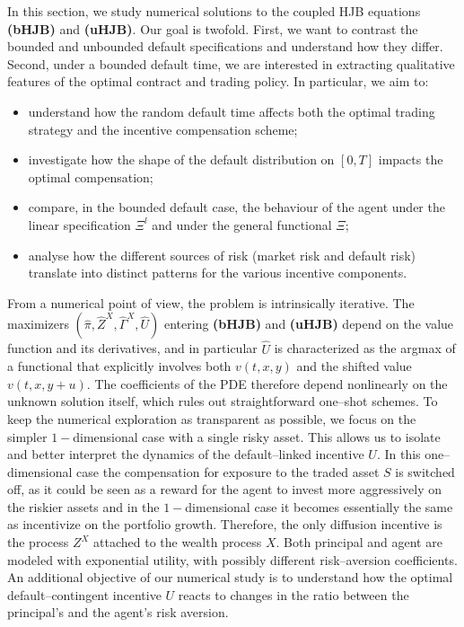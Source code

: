 \documentclass[11pt,a4paper]{article}
\theoremstyle{thmstyleone}%
\theoremstyle{thmstyletwo}%
\theoremstyle{thmstylethree}%
\begin{document}
In this section, we study numerical solutions to the coupled HJB equations
\textbf{(bHJB)} and \textbf{(uHJB)}. Our goal is twofold. First, we want to contrast the bounded and unbounded default specifications and understand how they differ. Second, under a bounded default time, we are interested in extracting qualitative features of the optimal contract and trading policy. In particular, we aim to:
\begin{itemize}
    \item understand how the random default time affects both the optimal
    trading strategy and the incentive compensation scheme;
    \item investigate how the shape of the default distribution on $[0,T]$ impacts the optimal compensation;
    \item compare, in the bounded default case, the behaviour of the
    agent under the linear specification $\Xi^l$ and under the general functional $\Xi$;
    \item analyse how the different sources of risk (market risk and default
    risk) translate into distinct patterns for the various incentive
    components.
\end{itemize}
From a numerical point of view, the problem is intrinsically iterative. The maximizers $(\hat \pi,\hat Z^X,\hat \Gamma^X,\hat U)$ entering
\textbf{(bHJB)} and \textbf{(uHJB)} depend on the value function and its
derivatives, and in particular $\hat U$ is characterized as the argmax of a functional that explicitly involves both $v(t,x,y)$ and the shifted value $v(t,x,y+u)$. The coefficients of the PDE therefore depend nonlinearly on the
unknown solution itself, which rules out straightforward one–shot schemes.
To keep the numerical exploration as transparent as possible, we focus on the simpler $1-$dimensional case with a single risky asset. This allows us to isolate and better interpret the
dynamics of the default–linked incentive $U$. In this one–dimensional case the compensation for exposure to the traded asset $S$ is switched off, as it could be seen as a reward for the agent to invest more aggressively on the riskier assets and in the $1-$dimensional case it becomes essentially the same as incentivize on the portfolio growth. Therefore, the only diffusion incentive is the process $Z^X$ attached to the wealth process $X$. Both principal and agent are modeled with exponential utility, with possibly different risk–aversion coefficients. An additional objective of our numerical study is to understand how the optimal default–contingent incentive $U$ reacts to changes in the ratio between the principal’s and the agent’s risk aversion.
\end{document}
